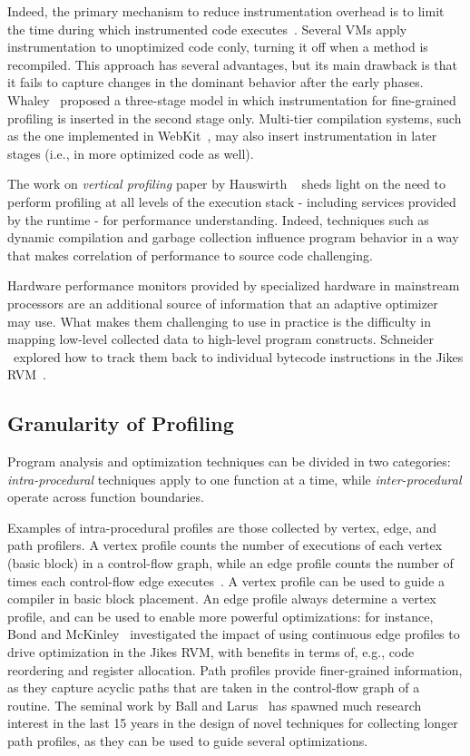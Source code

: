 Indeed, the primary mechanism to reduce instrumentation overhead is to limit the time during which instrumented code executes~\cite{Arnold05}. Several VMs apply instrumentation to unoptimized code conly, turning it off when a method is recompiled. This approach has several advantages, but its main drawback is that it fails to capture changes in the dominant behavior after the early phases. Whaley~\cite{Whaley01} proposed a three-stage model in which instrumentation for fine-grained profiling is inserted in the second stage only. Multi-tier compilation systems, such as the one implemented in WebKit~\cite{Pizlo14}, may also insert instrumentation in later stages (i.e., in more optimized code as well).

The work on {\em vertical profiling} paper by Hauswirth \etal~\cite{Hauswirth04} sheds light on the need to perform profiling at all levels of the execution stack - including services provided by the runtime - for performance understanding. Indeed, techniques such as dynamic compilation and garbage collection influence program behavior in a way that makes correlation of performance to source code challenging.

Hardware performance monitors provided by specialized hardware in mainstream processors are an additional source of information that an adaptive optimizer may use. What makes them challenging to use in practice is the difficulty in mapping low-level collected data to high-level program constructs. Schneider \etal\ explored how to track them back to individual bytecode instructions in the Jikes RVM~\cite{Schneider07}.

\subsection*{Granularity of Profiling}

Program analysis and optimization techniques can be divided in two categories: {\em intra-procedural} techniques apply to one function at a time, while {\em inter-procedural} operate across function boundaries.

Examples of intra-procedural profiles are those collected by vertex, edge, and path profilers. A vertex profile counts the number of executions of each vertex (basic block) in a control-flow graph, while an edge profile counts the number of times each control-flow edge executes~\cite{Ball94}. A vertex profile can be used to guide a compiler in basic block placement. An edge profile always determine a vertex profile, and can be used to enable more powerful optimizations: for instance, Bond and McKinley~\cite{Bond05} investigated the impact of using continuous edge profiles to drive optimization in the Jikes RVM, with benefits in terms of, e.g., code reordering and register allocation. Path profiles provide finer-grained information, as they capture acyclic paths that are taken in the control-flow graph of a routine. The seminal work by Ball and Larus~\cite{Ball96} has spawned much research interest in the last 15 years in the design of novel techniques for collecting longer path profiles, as they can be used to guide several optimizations.


